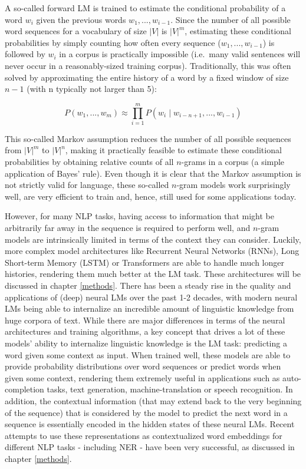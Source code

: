 \documentclass[12pt,a4paper,]{book}
\begin{document}
A so-called forward LM is trained to estimate the conditional probability of a word \(w_i\) given the previous words \({w_1,..., w_{i-1}}\). Since the number of all possible word sequences for a vocabulary of size \(|V|\) is \(|V|^m\), estimating these conditional probabilities by simply counting how often every sequence (\(w_1,..., w_{i-1}\)) is followed by \(w_i\) in a corpus is practically impossible (i.e.~many valid sentences will never occur in a reasonably-sized training corpus). Traditionally, this was often solved by approximating the entire history of a word by a fixed window of size \(n - 1\) (with n typically not larger than 5):

\begin{equation}
P\left(w_1, ..., w_m\right) \approx \prod_{i=1}^mP\left(w_i \mid w_{i - n + 1}, ..., w_{i-1}\right)
\end{equation}

This so-called Markov assumption \citep{manning2019} reduces the number of all possible sequences from \(|V|^m\) to \(|V|^n\), making it practically feasible to estimate these conditional probabilities by obtaining relative counts of all \(n\)-grams in a corpus (a simple application of Bayes' rule). Even though it is clear that the Markov assumption is not strictly valid for language, these so-called \(n\)-gram models work surprisingly well, are very efficient to train and, hence, still used for some applications today.

However, for many NLP tasks, having access to information that might be arbitrarily far away in the sequence is required to perform well, and \(n\)-gram models are intrinsically limited in terms of the context they can consider. Luckily, more complex model architectures like Recurrent Neural Networks (RNNs), Long Short-term Memory (LSTM) or Transformers are able to handle much longer histories, rendering them much better at the LM task. These architectures will be discussed in chapter \ref{methods}. There has been a steady rise in the quality and applications of (deep) neural LMs over the past 1-2 decades, with modern neural LMs being able to internalize an incredible amount of linguistic knowledge from huge corpora of text. While there are major differences in terms of the neural architectures and training algorithms, a key concept that drives a lot of these models' ability to internalize linguistic knowledge is the LM task: predicting a word given some context as input. When trained well, these models are able to provide probability distributions over word sequences or predict words when given some context, rendering them extremely useful in applications such as auto-completion tasks, text generation, machine-translation or speech recognition. In addition, the contextual information (that may extend back to the very beginning of the sequence) that is considered by the model to predict the next word in a sequence is essentially encoded in the hidden states of these neural LMs. Recent attempts to use these representations as contextualized word embeddings for different NLP tasks - including NER - have been very successful, as discussed in chapter \ref{methods}.
\end{document}
